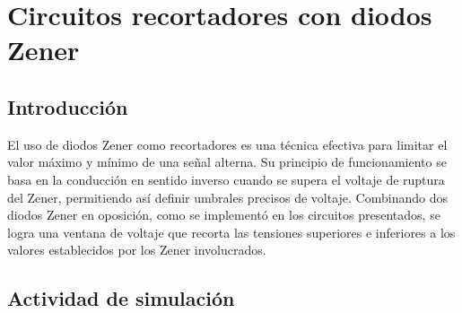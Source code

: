 \chapter{Circuitos recortadores con diodos Zener}
    \section{Introducción}
        El uso de diodos Zener como recortadores es una técnica efectiva para limitar el valor máximo y mínimo de una señal alterna. Su principio de funcionamiento se basa en la conducción en sentido inverso cuando se supera el voltaje de ruptura del Zener, permitiendo así definir umbrales precisos de voltaje. Combinando dos diodos Zener en oposición, como se implementó en los circuitos presentados, se logra una ventana de voltaje que recorta las tensiones superiores e inferiores a los valores establecidos por los Zener involucrados.

\section{Actividad de simulación}

